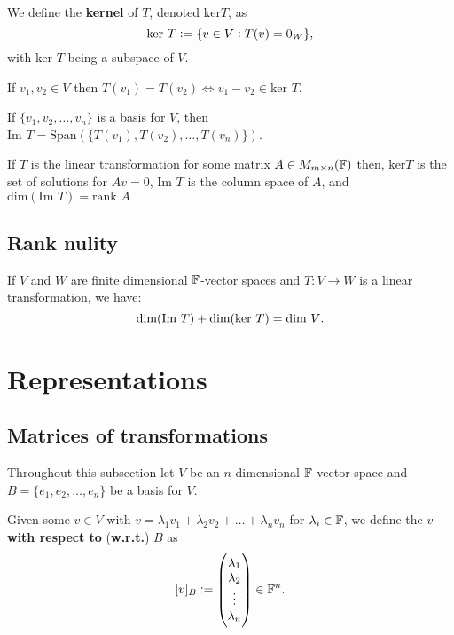 \documentclass[../Year1.tex]{subfiles}
\begin{document}
\begin{definition}[Kernel]
    We define the \textbf{kernel} of $T$, denoted $\text{ker}T$, as \[
        \text{ker }T := \{v\in V: T(v)=0_W\}
        \textcolor{black}{,}
    \]
    with $\text{ker }T$ being a subspace of $V$.
\end{definition}

\begin{theorem}
    If $v_1,v_2\in V$ then $T(v_1)=T(v_2) \iff v_1-v_2\in\text{ker }T$.
\end{theorem}

\begin{theorem}
    If $\{v_1,v_2,\ldots,v_n\}$ is a basis for $V$, then $\text{Im }T = \text{Span}(\{T(v_1),T(v_2),\ldots,T(v_n)\})$.
\end{theorem}

\begin{remark}
    If $T$ is the linear transformation for some matrix $A\in M_{m\times n}(\mathbb{F})$ then, $\text{ker} T$ is the set of solutions for $Av=0$, $\text{Im }T$ is the column space of $A$, and $\text{dim}(\text{Im }T)=\text{rank }A$
\end{remark}

\subsection{Rank nulity}

\begin{theorem}
    If $V$ and $W$ are finite dimensional $\mathbb{F}$-vector spaces and $T:V\rightarrow W$ is a linear transformation, we have: \[
        \text{dim}(\text{Im }T) + \text{dim}(\text{ker }T) = \text{dim }V
    \textcolor{black}{.}
    \]
\end{theorem}

\section{Representations}

\subsection{Matrices of transformations}
Throughout this subsection let $V$ be an $n$-dimensional $\mathbb{F}$-vector space and $B=\{e_1, e_2, \ldots, e_n\}$ be a basis for $V$.

\begin{definition}
    Given some $v\in V$ with $v = \lambda_1v_1 + \lambda_2v_2 + \dots + \lambda_nv_n$ for $\lambda_i\in\mathbb{F}$, we define the $v$ \textbf{with respect to} (\textbf{w.r.t.}) $B$ as \[
     [v]_B := \begin{pmatrix}
         \lambda_1 \\
         \lambda_2 \\
         \vdots \\
         \lambda_n
     \end{pmatrix} \in \mathbb{F}^n
     \textcolor{black}{.}
    \]
\end{definition}
\end{document}
